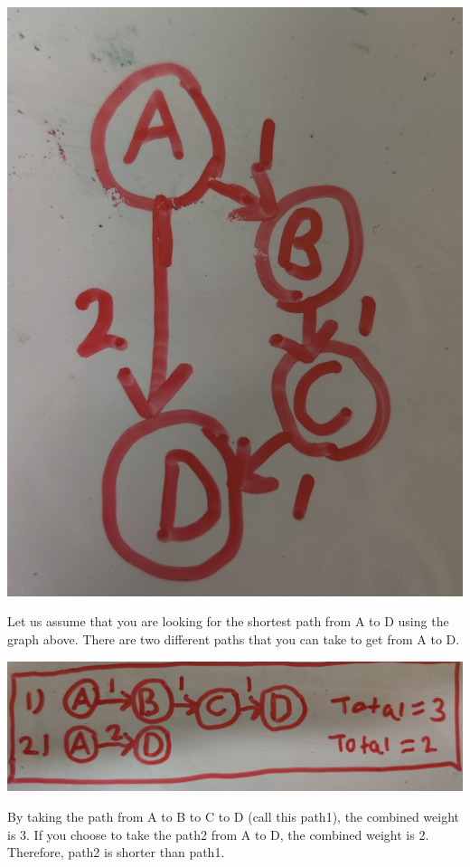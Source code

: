 \documentclass[11pt]{article}
\begin{document}
\begin{center}
\includegraphics[keepaspectratio=true,scale=0.25]{graph2.jpg}
\end{center}
Let us assume that you are looking for the shortest path from A to D using the graph above. There are two different paths that you can take to get from A to D.

\begin{center}
\includegraphics[keepaspectratio=true,scale=0.25]{original_paths2.jpg}
\end{center}
By taking the path from A to B to C to D (call this path1), the combined weight is 3. If you choose to take the path2 from A to D, the combined weight is 2. Therefore, path2 is shorter than path1.
\end{document}
